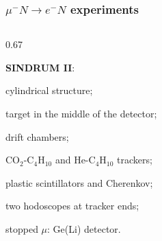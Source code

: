 \documentclass{beamer}
\begin{document}
    \begin{frame}
        \frametitle{$\mu^- N \rightarrow e^- N$ experiments}
        \vspace{-3mm}
\begin{columns}
 \begin{column}{0.67\framewidth}
 \setlength{\leftmargini}{1.1em}

    \begin{itemize}

        {\small    
   
   \item \textbf{SINDRUM II}: }

\begin{itemize}
    {\small  
    \item cylindrical structure;
    \item target in the middle of the detector;
    \item drift chambers;
    \item CO$_2$-C$_4$H$_10$ and He-C$_4$H$_10$ trackers; 
    \item plastic scintillators and Cherenkov;
    \item two hodoscopes at tracker ends;
    \item stopped $\mu$: Ge(Li) detector.
    }
\end{itemize}


   {\small    
   
}
\end{itemize}
\end{column}
\end{columns}
\end{frame}
\end{document}
